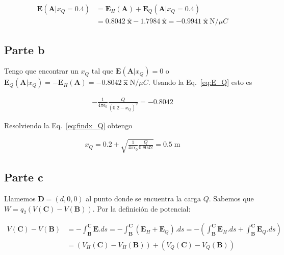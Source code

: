 \documentclass[12pt]{article}
\begin{document}
\begin{align*}
    \mathbf{E}(\mathbf{A}|x_Q=0.4)&=\mathbf{E}_H(\mathbf{A})+\mathbf{E}_Q(\mathbf{A}|x_Q=0.4)\\
                         &=0.8042\;\hat{\mathbf{x}} - 1.7984\;\hat{\mathbf{x}}=
                         -0.9941\;\hat{\mathbf{x}}\;\text{N}/\mu C
\end{align*}

\noindent{}

\subsection*{Parte b}

Tengo que encontrar un $x_Q$ tal que $\mathbf{E}(\mathbf{A}|x_Q)=0$ o
$\mathbf{E}_Q(\mathbf{A}|x_Q)=-\mathbf{E}_H(\mathbf{A})=-0.8042\;\hat{\mathbf{x}}\;\text{N}/\mu C$.
Usando la Eq.~\ref{eq:E_Q} esto es

\begin{align}
    -\frac{1}{4\pi\epsilon_0}\frac{Q}{(0.2-x_Q)^2}=-0.8042\label{eq:findx_Q}
\end{align}

\noindent Resolviendo la Eq.~\ref{eq:findx_Q} obtengo

\begin{align*}
    x_Q=0.2+\sqrt{\frac{1}{4\pi\epsilon_0}\frac{Q}{0.8042}}=0.5\;\text{m}
\end{align*}

\noindent{}

\subsection*{Parte c}

Llamemos $\mathbf{D}=(d,0,0)$ al punto donde se encuentra la carga $Q$.
%
Sabemos que $W=q_2(V(\mathbf{C})-V(\mathbf{B}))$.
%
Por la definición de potencial:

\begin{align*}
    V(\mathbf{C})-V(\mathbf{B})&=-\int_\mathbf{B}^\mathbf{C}\mathbf{E}.ds=-\int_\mathbf{B}^\mathbf{C}(\mathbf{E}_H+\mathbf{E}_Q).ds=-\left(\int_\mathbf{B}^\mathbf{C}\mathbf{E}_H.ds+\int_\mathbf{B}^\mathbf{C}\mathbf{E}_Q.ds\right)\\
                               &=\left(V_H(\mathbf{C})-V_H(\mathbf{B})\right)+\left(V_Q(\mathbf{C})-V_Q(\mathbf{B})\right)
\end{align*}
\end{document}

